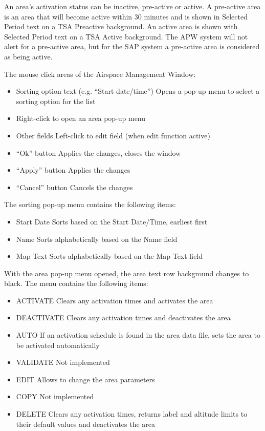 \documentclass[a4paper,oneside,11pt]{memoir}
\newcommand{\colorref}[1]{\colorbox{Flight Highlight}{\color{#1}#1}}
\begin{document}
\bigskip

An area’s activation status can be inactive, pre-active or active. A pre-active area is an area that will become active within 30 minutes and is shown in \colorref{Selected Period} text on a \colorref{TSA Preactive} background. An active area is shown with \colorref{Selected Period} text on a \colorref{TSA Active} background. The APW system will not alert for a pre-active area, but for the SAP system a pre-active area is considered as being active.

\bigskip

The mouse click areas of the Airspace Management Window:


\begin{itemize} 
        \item Sorting option text (e.g. “Start date/time”) Opens a pop-up menu to select a sorting option for the list 
        \item Right-click to open an area pop-up menu
        \item Other fields Left-click to edit field (when edit function active)
        \item “Ok” button Applies the changes, closes the window
        \item “Apply” button Applies the changes
        \item “Cancel” button Cancels the changes 
\end{itemize}

\bigskip

The sorting pop-up menu contains the following items:

\begin{itemize}
        \item Start Date Sorts based on the Start Date/Time, earliest first
        \item Name Sorts alphabetically based on the Name field
        \item Map Text Sorts alphabetically based on the Map Text field 
\end{itemize}

\bigskip

With the area pop-up menu opened, the area text row background changes to black. The menu contains the following items:

\begin{itemize}
        \item ACTIVATE Clears any activation times and activates the area
        \item DEACTIVATE Clears any activation times and deactivates the area
        \item AUTO If an activation schedule is found in the area data file, sets the area to be activated automatically
        \item VALIDATE Not implemented
        \item EDIT Allows to change the area parameters
        \item COPY Not implemented
        \item DELETE Clears any activation times, returns label and altitude limits to their default values and deactivates the area
\end{itemize}
\end{document}

